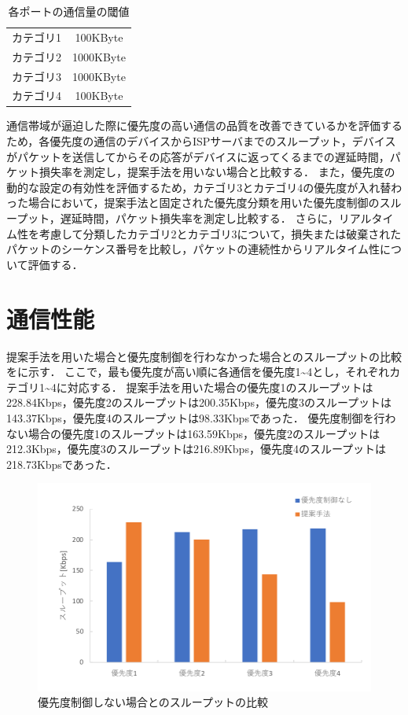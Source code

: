 \documentclass[a4paper,11pt,uplatex]{ujreport}
\begin{document}
  \begin{table}[tb]
    \caption{各ポートの通信量の閾値}
    \label{tab:threshold}
    \centering
    \begin{tabular}{cc}
      \hline
      カテゴリ1 & 100KByte\\
      カテゴリ2 & 1000KByte\\
      カテゴリ3 & 1000KByte\\
      カテゴリ4 & 100KByte\\
      \hline
    \end{tabular}
  \end{table}

  通信帯域が逼迫した際に優先度の高い通信の品質を改善できているかを評価するため，各優先度の通信のデバイスからISPサーバまでのスループット，デバイスがパケットを送信してからその応答がデバイスに返ってくるまでの遅延時間，パケット損失率を測定し，提案手法を用いない場合と比較する．
  また，優先度の動的な設定の有効性を評価するため，カテゴリ3とカテゴリ4の優先度が入れ替わった場合において，提案手法と固定された優先度分類を用いた優先度制御のスループット，遅延時間，パケット損失率を測定し比較する．
  さらに，リアルタイム性を考慮して分類したカテゴリ2とカテゴリ3について，損失または破棄されたパケットのシーケンス番号を比較し，パケットの連続性からリアルタイム性について評価する．

\section{通信性能}
\label{sec:通信性能}

  提案手法を用いた場合と優先度制御を行わなかった場合とのスループットの比較をに示す．
  ここで，最も優先度が高い順に各通信を優先度1\textasciitilde4とし，それぞれカテゴリ1\textasciitilde4に対応する．
  提案手法を用いた場合の優先度1のスループットは228.84Kbps，優先度2のスループットは200.35Kbps，優先度3のスループットは143.37Kbps，優先度4のスループットは98.33Kbpsであった．
  優先度制御を行わない場合の優先度1のスループットは163.59Kbps，優先度2のスループットは212.3Kbps，優先度3のスループットは216.89Kbps，優先度4のスループットは218.73Kbpsであった．

  \begin{figure}[tb]
    \centering
    \includegraphics[width=0.85\linewidth]{img/throughput_1.pdf}
    \caption{優先度制御しない場合とのスループットの比較}
    \label{fig:throughput_1}
  \end{figure}
\end{document}
